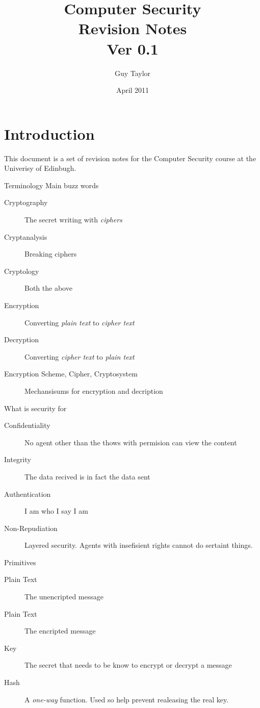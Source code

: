 \documentclass[11pt,twoside,a4paper]{article}
\begin{document}
  
  \title{Computer Security \\Revision Notes \\ Ver 0.1}
  \author{Guy Taylor}
  \date{April 2011}
  
  \maketitle
  
  \tableofcontents
  
  \section{Introduction}
    This document is a set of revision notes for the Computer Security \cite{cs_home} course at the Univerisy of Edinbugh.
  
  \clearpage
  
  \begin{section}{Terminology}
    Main buzz words
    \begin{description}
      \item[Cryptography] The secret writing with \emph{ciphers}
      \item[Cryptanalysis] Breaking ciphers
      \item[Cryptology] Both the above
      \item[Encryption] Converting \emph{plain text} to \emph{cipher text}
      \item[Decryption] Converting \emph{cipher text} to \emph{plain text}
      \item[Encryption Scheme, Cipher, Cryptosystem] Mechansisums for encryption and decription
    \end{description}
    
    What is security for
    \begin{description}
      \item[Confidentiality] No agent other than the thows with permision can view the content
      \item[Integrity] The data recived is in fact the data sent
      \item[Authentication] I am who I say I am
      \item[Non-Repudiation] Layered security. Agents with insefisient rights cannot do sertaint things.
    \end{description}
    
    
    Primitives
    \begin{description}
      \item[Plain Text] The unencripted message
      \item[Plain Text] The encripted message
      \item[Key] The secret that needs to be know to encrypt or decrypt a message
      \item[Hash] A \emph{one-way} function. Used so help prevent realeasing the real key.
    \end{description}
    
  \end{section}
  
\end{document}
